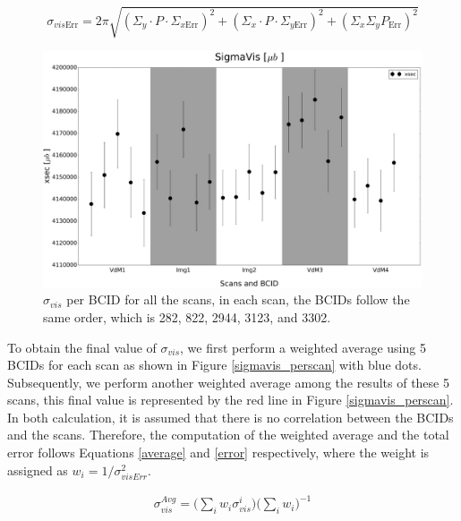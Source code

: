 \begin{equation}
\sigma_{vis\text{Err}}= 2 \pi \sqrt{ (\Sigma_{y} \cdot P \cdot \Sigma_{x\text{Err}})^{2} + (\Sigma_{x} \cdot P \cdot \Sigma_{y \text{Err}})^{2} + (\Sigma_{x} \Sigma_{y} P_{\text{Err}})^{2} }
\label{sigma_err}
\end{equation}


\begin{center}
  \begin{figure}[h!]
    \centering
    \includegraphics[scale=.30]{Chapter4/DGConst_xsec.png}
    \caption[$\sigma_{vis}$ per BCID for all scans]{ $\sigma_{vis}$ per BCID for all the scans,  in each scan, the BCIDs follow the same order, which is 282, 822, 2944, 3123, and 3302.}
    \label{sigmavis_perbcid}
  \end{figure}
\end{center}

To obtain the final value of $\sigma_{vis}$, we first perform a weighted average using 5 BCIDs for each scan as shown in Figure \ref{sigmavis_perscan} with blue dots. Subsequently, we perform another weighted average among the results of these 5 scans, this final value is represented by the red line in Figure \ref{sigmavis_perscan}. In both calculation, it is assumed that there is no correlation between the BCIDs and the scans. Therefore, the computation of the weighted average and the total error  follows Equations \ref{average} and \ref{error} respectively, where the weight is assigned as $w_{i} = 1/\sigma_{visErr}^{2}$. 


\begin{eqnarray}
\sigma_{vis}^{Avg}=\Biggl(\displaystyle\sum_{i} w_{i}\sigma_{vis}^{i} \Biggr)\Biggl( \displaystyle\sum_{i} w_{i} \Biggr)^{-1}
\label{average}
\end{eqnarray}

